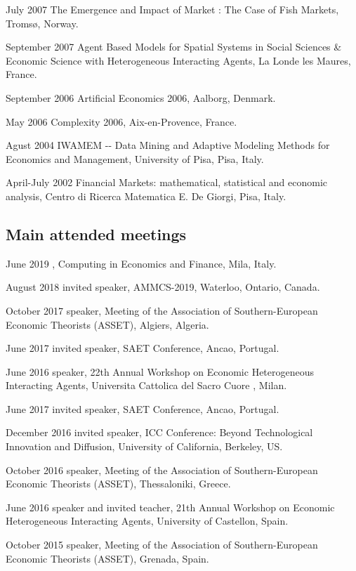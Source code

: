 \documentclass[a4paper]{article}
\begin{document}
July 2007 \textquotedbl{}The Emergence and Impact of Market : The Case of Fish
Markets\textquotedbl{}, Tromsø, Norway.

September 2007 \textquotedbl{}Agent Based Models for Spatial Systems in Social
Sciences \& Economic Science with Heterogeneous Interacting Agents\textquotedbl{},
La Londe les Maures, France.

September 2006 \textquotedbl{}Artificial Economics 2006\textquotedbl{}, Aalborg, Denmark.

May 2006 \textquotedbl{}Complexity 2006\textquotedbl{}, Aix-en-Provence, France.

Agust 2004 IWAMEM -{}- \textquotedbl{}Data Mining and Adaptive Modeling Methods for
Economics and Management\textquotedbl{}, University of Pisa, Pisa, Italy.

April-July 2002 \textquotedbl{}Financial Markets: mathematical, statistical and
economic analysis\textquotedbl{}, Centro di Ricerca Matematica E. De Giorgi, Pisa,
Italy.


\subsection{Main attended meetings%
  \label{main-attended-meetings}%
}

June 2019 , Computing in Economics and Finance, Mila, Italy.

August 2018 invited speaker, AMMCS-2019, Waterloo, Ontario, Canada.

October 2017 speaker, Meeting of the Association of Southern-European
Economic Theorists (ASSET), Algiers, Algeria.

June 2017 invited speaker, SAET Conference, Ancao, Portugal.

June 2016 speaker, 22th Annual Workshop on Economic Heterogeneous
Interacting Agents, Universita Cattolica del Sacro Cuore , Milan.

June 2017 invited speaker, SAET Conference, Ancao, Portugal.

December 2016 invited speaker, ICC Conference: Beyond Technological
Innovation and Diffusion, University of California, Berkeley, US.

October 2016 speaker, Meeting of the Association of Southern-European
Economic Theorists (ASSET), Thessaloniki, Greece.

June 2016 speaker and invited teacher, 21th Annual Workshop on
Economic Heterogeneous Interacting Agents, University of Castellon,
Spain.

October 2015 speaker, Meeting of the Association of Southern-European
Economic Theorists (ASSET), Grenada, Spain.
\end{document}
